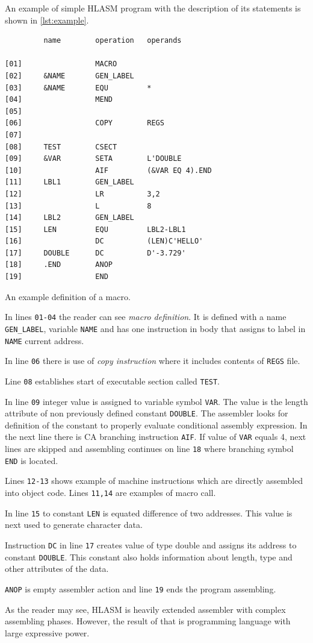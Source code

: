 An example of simple HLASM program with the description of its statements is shown in \cref{lst:example}.
\begin{listing}
\begin{verbatim}
         name        operation   operands
         
[01]                 MACRO                   
[02]     &NAME       GEN_LABEL
[03]     &NAME       EQU         *
[04]                 MEND
[05]             
[06]                 COPY        REGS
[07]             
[08]     TEST        CSECT
[09]     &VAR        SETA        L'DOUBLE
[10]                 AIF         (&VAR EQ 4).END
[11]     LBL1        GEN_LABEL
[12]                 LR          3,2
[13]                 L           8
[14]     LBL2        GEN_LABEL
[15]     LEN         EQU         LBL2-LBL1
[16]                 DC          (LEN)C'HELLO'
[17]     DOUBLE      DC          D'-3.729'
[18]     .END        ANOP
[19]                 END
\end{verbatim} 
\caption{An example definition of a macro.}
\label{lst:example}
\end{listing}

In lines \verb|01-04| the reader can see \textit{macro definition}. It is defined with a name \verb|GEN_LABEL|, variable \verb|NAME| and has one instruction in body that assigns to label in \verb|NAME| current address.

In line \verb|06| there is use of \textit{copy instruction} where it includes contents of \verb|REGS| file.

Line \verb|08| establishes start of executable section called \verb|TEST|. 

In line \verb|09| integer value is assigned to variable symbol \verb|VAR|. The value is the length attribute of non previously defined constant \verb|DOUBLE|. The assembler looks for definition of the constant to properly evaluate conditional assembly expression. In the next line there is CA branching instruction \verb|AIF|. If value of \verb|VAR| equals 4, next lines are skipped and assembling continues on line \verb|18| where branching symbol \verb|END| is located.  

Lines \verb|12-13| shows example of machine instructions which are directly assembled into object code. Lines \verb|11,14| are examples of macro call.

In line \verb|15| to constant \verb|LEN| is equated difference of two addresses. This value is next used to generate character data.

Instruction \verb|DC| in line \verb|17| creates value of type double and assigns its address to constant \verb|DOUBLE|. This constant also holds information about length, type and other attributes of the data.  

\verb|ANOP| is empty assembler action and line \verb|19| ends the program assembling. 

\vspace{5mm}
As the reader may see, HLASM is heavily extended assembler with complex assembling phases. 
However, the result of that is programming language with large expressive power. 

